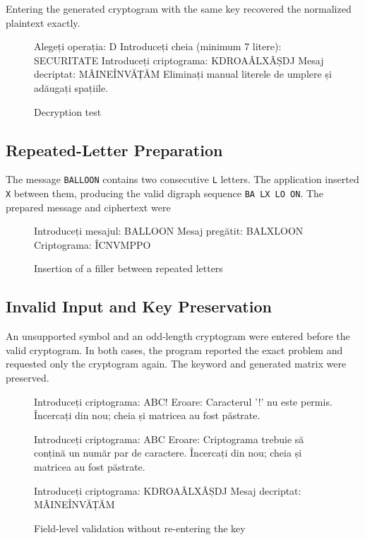 \documentclass[12pt,a4paper]{article}
\begin{document}
Entering the generated cryptogram with the same key recovered the normalized plaintext exactly.

\begin{figure}[H]
\centering
\caption{Decryption test}
\begin{minipage}{0.96\textwidth}
\begin{terminaloutput}
Alegeți operația: D
Introduceți cheia (minimum 7 litere): SECURITATE
Introduceți criptograma: KDROAÂLXÂȘDJ
Mesaj decriptat: MÂINEÎNVĂȚĂM
Eliminați manual literele de umplere și adăugați spațiile.
\end{terminaloutput}
\end{minipage}
\end{figure}

\subsection{Repeated-Letter Preparation}

The message \texttt{BALLOON} contains two consecutive \texttt{L} letters. The application inserted \texttt{X} between them, producing the valid digraph sequence \texttt{BA LX LO ON}. The prepared message and ciphertext were

\begin{figure}[H]
\centering
\caption{Insertion of a filler between repeated letters}
\begin{minipage}{0.96\textwidth}
\begin{terminaloutput}
Introduceți mesajul: BALLOON
Mesaj pregătit: BALXLOON
Criptograma: ÎCNVMPPO
\end{terminaloutput}
\end{minipage}
\end{figure}

\subsection{Invalid Input and Key Preservation}

An unsupported symbol and an odd-length cryptogram were entered before the valid cryptogram. In both cases, the program reported the exact problem and requested only the cryptogram again. The keyword and generated matrix were preserved.

\begin{figure}[H]
\centering
\caption{Field-level validation without re-entering the key}
\begin{minipage}{0.96\textwidth}
\begin{terminaloutput}
Introduceți criptograma: ABC!
Eroare: Caracterul '!' nu este permis.
Încercați din nou; cheia și matricea au fost păstrate.

Introduceți criptograma: ABC
Eroare: Criptograma trebuie să conțină un număr par
de caractere.
Încercați din nou; cheia și matricea au fost păstrate.

Introduceți criptograma: KDROAÂLXÂȘDJ
Mesaj decriptat: MÂINEÎNVĂȚĂM
\end{terminaloutput}
\end{minipage}
\end{figure}
\end{document}
